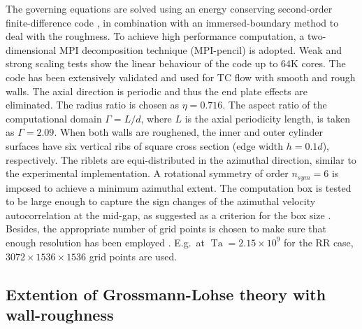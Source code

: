 \documentclass[aps,prl,superscriptaddress,preprint]{revtex4}
\newcommand{\Ta}{\operatorname{Ta}}
\begin{document}
The governing equations are solved using an energy conserving second-order finite-difference code \citep{ver96}, in combination with an immersed-boundary method \citep{fad00,yan06} to deal with the roughness. To achieve high performance computation, a two-dimensional MPI decomposition technique (MPI-pencil) \citep{poe15cf} is adopted. Weak and strong scaling tests show the linear behaviour of the code up to 64K cores. 
The code has been extensively validated and used for TC flow with smooth \cite{ost14pof, ost14pd, ost15pof} and rough \cite{zhu16,zhu17} walls. The axial direction is periodic and thus the end plate effects \cite{avi12} are eliminated. The radius ratio is chosen as $\eta=0.716$. The aspect ratio of the computational domain $\Gamma=L/d$, where $L$ is the axial periodicity length, is taken as $\Gamma=2.09$. When both walls are roughened, the inner and outer cylinder 
surfaces have six vertical ribs of square cross section
(edge width $h=0.1d$), respectively. The riblets are equi-distributed in the azimuthal
direction, similar to the experimental implementation. A rotational symmetry of order $n_{sym}=6$ is imposed to achieve a minimum azimuthal extent. The computation box is tested to be large enough to capture the sign changes of the azimuthal velocity autocorrelation at the mid-gap, as suggested as a criterion for the box size \cite{ost15pof}. Besides, the appropriate number of grid points
is chosen to make sure that enough resolution has been employed \cite{ost14pof,ost14pd}. E.g.\ at $\Ta=2.15\times10^9$ for the RR case, $3072\times1536\times1536$ grid points are used.


\subsection{Extention of Grossmann-Lohse theory with wall-roughness}
\end{document}
